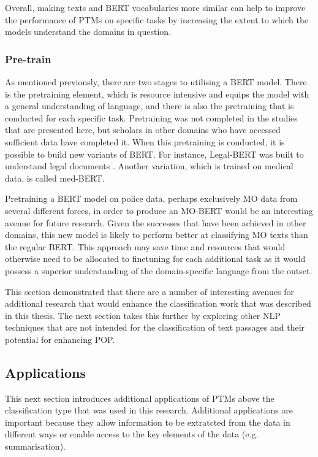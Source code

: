 Overall, making texts and BERT vocabularies more similar can help to improve the performance of PTMs on specific tasks by increasing the extent to which the models understand the domains in question.

\subsubsection{Pre-train} As mentioned previously, there are two stages to utilising a BERT model. There is the pretraining element, which is resource intensive and equips the model with a general understanding of language, and there is also the pretraining that is conducted for each specific task. Pretraining was not completed in the studies that are presented here, but scholars in other domains who have accessed sufficient data have completed it. When this pretraining is conducted, it is possible to build new variants of BERT. For instance, Legal-BERT was built to understand legal documents \parencite{legal_bert}. Another variation, which is trained on medical data, is called med-BERT.

Pretraining a BERT model on police data, perhaps exclusively MO data from several different forces, in order to produce an MO-BERT would be an interesting avenue for future research. Given the successes that have been achieved in other domains, this new model is likely to perform better at classifying MO texts than the regular BERT. This approach may save time and resources that would otherwise need to be allocated to finetuning for each additional task as it would possess a superior understanding of the domain-specific language from the outset.

This section demonstrated that there are a number of interesting avenues for additional research that would enhance the classification work that was described in this thesis. The next section takes this further by exploring other NLP techniques that are not intended for the classification of text passages and their potential for enhancing POP.

\subsection{Applications} This next section introduces additional applications of PTMs above the classification type that was used in this research. Additional applications are important because they allow information to be extratcted from the data in different ways or enable access to the key elements of the data (e.g. summarisation).

